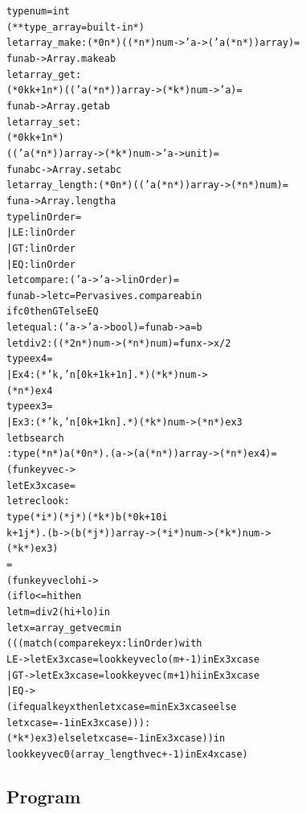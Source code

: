 \documentclass{article}
\newcommand{\tmverbatim}[1]{{\ttfamily{#1}}}
\newenvironment{tmcode}[1][]{\begin{alltt}}{\end{alltt}}
\begin{document}
\begin{tmcode}
type num = int
(** type _ array = built-in *)
let array_make : (*0  n*) ((* n *) num -> 'a -> ('a (* n *)) array) =
  fun a b -> Array.make a b
let array_get :
  (*0  k  k + 1  n*) (('a (* n *)) array -> (* k *) num -> 'a) =
  fun a b -> Array.get a b
let array_set :
  (*0  k  k + 1  n*)
  (('a (* n *)) array -> (* k *) num -> 'a -> unit) =
  fun a b c -> Array.set a b c
let array_length : (*0  n*) (('a (* n *)) array -> (* n *) num) =
  fun a -> Array.length a
type linOrder =
  | LE : linOrder
  | GT : linOrder
  | EQ : linOrder
let compare : ('a -> 'a -> linOrder) =
  fun a b -> let c = Pervasives.compare a b in
              if c  0 then GT else EQ
let equal : ('a -> 'a -> bool) = fun a b -> a = b
let div2 : ((* 2 n *) num -> (* n *) num) = fun x -> x / 2
type ex4 =
  | Ex4 : (*'k, 'n[0  k + 1  k + 1  n].*)(* k *) num ->
    (* n *) ex4
type ex3 =
  | Ex3 : (*'k, 'n[0  k + 1  k  n].*)(* k *) num -> (* n *) ex3
let bsearch
  : type (*n*) a (*0  n*). (a -> (a (* n *)) array -> (* n *) ex4) =
  (fun key vec ->
    let Ex3 xcase =
    let rec look :
    type (*i*) (*j*) (*k*) b (*0  k + 1  0  i 
    k + 1  j*). (b -> (b (* j *)) array -> (* i *) num -> (* k *) num ->
                     (* k *) ex3)
    =
    (fun key vec lo hi ->
      (if lo <= hi then
      let m = div2 (hi + lo) in
      let x = array_get vec m in
      (((match (compare key x: linOrder) with
      LE -> let Ex3 xcase = look key vec lo (m + -1) in Ex3 xcase
        | GT -> let Ex3 xcase = look key vec (m + 1) hi in Ex3 xcase
        | EQ ->
            (if equal key x then let xcase = m in Ex3 xcase else
            let xcase = -1 in Ex3 xcase))) :
      (* k *) ex3) else let xcase = -1 in Ex3 xcase)) in
    look key vec 0 (array_length vec + -1) in Ex4 xcase)
\end{tmcode}

\subsection{Program \tmverbatim{queen}}
\end{document}
